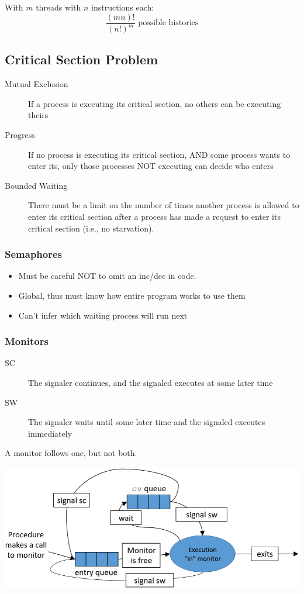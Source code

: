 \documentclass[a4paper]{article}
\begin{document}
\begin{multicols*}{2}
    With \(m\) threads with \(n\) instructions each: \[\frac{(mn)!}{(n!)^m}
        \text{ possible histories}\]

    \subsection*{Critical Section Problem}

    \begin{description}
        \item[Mutual Exclusion] If a process is executing its critical section, no others can be executing theirs
        \item[Progress] If no process is executing its critical section, AND
            some process wants to enter its, only those processes NOT executing can
            decide who enters
        \item[Bounded Waiting] There must be a limit on the number of times another process is allowed to enter its critical section after a process has made a request to enter its critical section (i.e., no starvation).
    \end{description}

    \subsubsection*{Semaphores}
    \begin{itemize}
        \item Must be careful NOT to omit an inc/dec in code.
        \item Global, thus must know how entire program works to use them
        \item Can't infer which waiting process will run next
    \end{itemize}
    \subsubsection*{Monitors}
    \begin{description}
        \item[SC] The signaler continues, and the signaled executes at some later time
        \item[SW] The signaler waits until some later time and the signaled executes immediately
    \end{description}
    A monitor follows one, but not both.

    \includegraphics[width=\columnwidth]{scheduling.png}


\end{multicols*}
\end{document}
